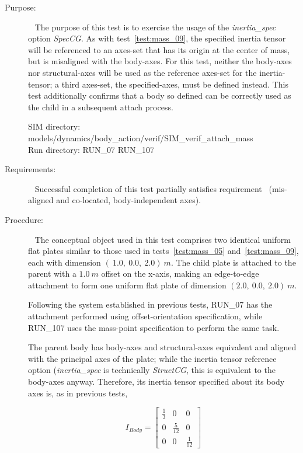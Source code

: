 \label{test:mass_07}
\begin{description}
\item[Purpose:] \ \newline
The purpose of this test is to exercise the usage of the
\textit{inertia\_spec} option \textit{SpecCG}.  As with
test~\ref{test:mass_09}, the specified inertia tensor will be referenced to an
axes-set that
has its origin at the center of mass, but is misaligned with the body-axes.
For this test, neither the body-axes nor structural-axes will be used as the
reference axes-set for the inertia-tensor; a third axes-set, the
specified-axes, must be defined instead.
This test
additionally confirms that a body so defined can be correctly used as the
child in a subsequent attach process.

SIM directory: models/dynamics/body\_action/verif/SIM\_verif\_attach\_mass\\
Run directory: RUN\_07 RUN\_107


\item[Requirements:] \ \newline
Successful completion of this test partially satisfies
requirement~ (mis-aligned and co-located,
body-independent axes).


\item[Procedure:]\ \newline
The conceptual object used in this test comprises two identical uniform flat
plates similar to those used in tests~\ref{test:mass_05}
and~\ref{test:mass_09}, each with dimension $(~1.0, ~0.0, ~2.0) ~m$.  The
child plate is attached to the parent with a $1.0~m$ offset on the x-axis,
making an edge-to-edge attachment to form one
uniform flat plate of dimension $(2.0, ~0.0, ~2.0) ~m$.

Following the system established in previous tests, RUN\_07 has the attachment
performed using offset-orientation specification, while RUN\_107 uses the
mass-point specification to perform the same task.

The parent body has body-axes and structural-axes equivalent and aligned
with the principal axes of the plate; while the inertia tensor reference
option (\textit{inertia\_spec} is technically \textit{StructCG}, this is
equivalent to the body-axes anyway.  Therefore, its inertia tensor
specified about its body axes is, as in previous tests,

\begin{equation*}
I_{Body} =
   \begin{bmatrix} \frac{1}{3} & 0   & 0  \\
                   0   & \frac{5}{12} & 0  \\
                    0  & 0  & \frac{1}{12}
   \end{bmatrix}
\end{equation*}


\end{description}
